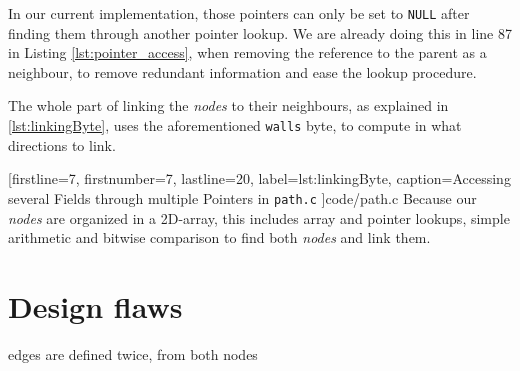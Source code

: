 In our current implementation,
those pointers can only be set to {\tt NULL} after finding them through another pointer lookup.
We are already doing this in line 87 in Listing \ref{lst:pointer_access},
when removing the reference to the parent as a neighbour,
to remove redundant information and ease the lookup procedure.

The whole part of linking the \emph{nodes} to their neighbours,
as explained in \ref{lst:linkingByte},
uses the aforementioned {\tt walls} byte,
to compute in what directions to link.


[firstline=7,				%
firstnumber=7,
lastline=20,
label=lst:linkingByte,	%
caption={Accessing several Fields through multiple Pointers in {\tt path.c}}
]{code/path.c}
%
Because our \emph{nodes} are organized in a 2D-array,
this includes array and pointer lookups,
simple arithmetic and
bitwise comparison
to find both \emph{nodes} and link them.

\section{Design flaws}
edges are defined twice, from both nodes
